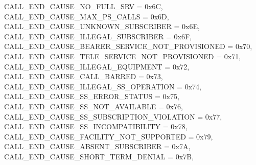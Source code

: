 \begin{DoxyItemize}
 C\+A\+L\+L\+\_\+\+E\+N\+D\+\_\+\+C\+A\+U\+S\+E\+\_\+\+N\+O\+\_\+\+F\+U\+L\+L\+\_\+\+S\+RV = 0x6C,~\newline
 C\+A\+L\+L\+\_\+\+E\+N\+D\+\_\+\+C\+A\+U\+S\+E\+\_\+\+M\+A\+X\+\_\+\+P\+S\+\_\+\+C\+A\+L\+LS = 0x6D,~\newline
 C\+A\+L\+L\+\_\+\+E\+N\+D\+\_\+\+C\+A\+U\+S\+E\+\_\+\+U\+N\+K\+N\+O\+W\+N\+\_\+\+S\+U\+B\+S\+C\+R\+I\+B\+ER = 0x6E,~\newline
 C\+A\+L\+L\+\_\+\+E\+N\+D\+\_\+\+C\+A\+U\+S\+E\+\_\+\+I\+L\+L\+E\+G\+A\+L\+\_\+\+S\+U\+B\+S\+C\+R\+I\+B\+ER = 0x6F,~\newline
 C\+A\+L\+L\+\_\+\+E\+N\+D\+\_\+\+C\+A\+U\+S\+E\+\_\+\+B\+E\+A\+R\+E\+R\+\_\+\+S\+E\+R\+V\+I\+C\+E\+\_\+\+N\+O\+T\+\_\+\+P\+R\+O\+V\+I\+S\+I\+O\+N\+ED = 0x70,~\newline
 C\+A\+L\+L\+\_\+\+E\+N\+D\+\_\+\+C\+A\+U\+S\+E\+\_\+\+T\+E\+L\+E\+\_\+\+S\+E\+R\+V\+I\+C\+E\+\_\+\+N\+O\+T\+\_\+\+P\+R\+O\+V\+I\+S\+I\+O\+N\+ED = 0x71,~\newline
 C\+A\+L\+L\+\_\+\+E\+N\+D\+\_\+\+C\+A\+U\+S\+E\+\_\+\+I\+L\+L\+E\+G\+A\+L\+\_\+\+E\+Q\+U\+I\+P\+M\+E\+NT = 0x72,~\newline
 C\+A\+L\+L\+\_\+\+E\+N\+D\+\_\+\+C\+A\+U\+S\+E\+\_\+\+C\+A\+L\+L\+\_\+\+B\+A\+R\+R\+ED = 0x73,~\newline
 C\+A\+L\+L\+\_\+\+E\+N\+D\+\_\+\+C\+A\+U\+S\+E\+\_\+\+I\+L\+L\+E\+G\+A\+L\+\_\+\+S\+S\+\_\+\+O\+P\+E\+R\+A\+T\+I\+ON = 0x74,~\newline
 C\+A\+L\+L\+\_\+\+E\+N\+D\+\_\+\+C\+A\+U\+S\+E\+\_\+\+S\+S\+\_\+\+E\+R\+R\+O\+R\+\_\+\+S\+T\+A\+T\+US = 0x75,~\newline
 C\+A\+L\+L\+\_\+\+E\+N\+D\+\_\+\+C\+A\+U\+S\+E\+\_\+\+S\+S\+\_\+\+N\+O\+T\+\_\+\+A\+V\+A\+I\+L\+A\+B\+LE = 0x76,~\newline
 C\+A\+L\+L\+\_\+\+E\+N\+D\+\_\+\+C\+A\+U\+S\+E\+\_\+\+S\+S\+\_\+\+S\+U\+B\+S\+C\+R\+I\+P\+T\+I\+O\+N\+\_\+\+V\+I\+O\+L\+A\+T\+I\+ON = 0x77,~\newline
 C\+A\+L\+L\+\_\+\+E\+N\+D\+\_\+\+C\+A\+U\+S\+E\+\_\+\+S\+S\+\_\+\+I\+N\+C\+O\+M\+P\+A\+T\+I\+B\+I\+L\+I\+TY = 0x78,~\newline
 C\+A\+L\+L\+\_\+\+E\+N\+D\+\_\+\+C\+A\+U\+S\+E\+\_\+\+F\+A\+C\+I\+L\+I\+T\+Y\+\_\+\+N\+O\+T\+\_\+\+S\+U\+P\+P\+O\+R\+T\+ED = 0x79,~\newline
 C\+A\+L\+L\+\_\+\+E\+N\+D\+\_\+\+C\+A\+U\+S\+E\+\_\+\+A\+B\+S\+E\+N\+T\+\_\+\+S\+U\+B\+S\+C\+R\+I\+B\+ER = 0x7A,~\newline
 C\+A\+L\+L\+\_\+\+E\+N\+D\+\_\+\+C\+A\+U\+S\+E\+\_\+\+S\+H\+O\+R\+T\+\_\+\+T\+E\+R\+M\+\_\+\+D\+E\+N\+I\+AL = 0x7B,~\newline

\end{DoxyItemize}
